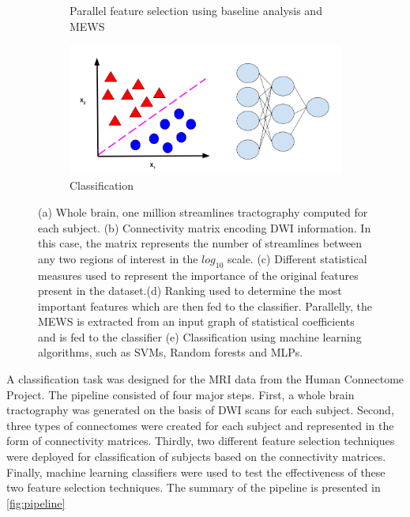 \documentclass[msthesis.tex]{subfiles}
\begin{document}
\begin{figure}
\begin{subfigure}[b]{0.9\textwidth}
\begin{subfigure}[b]{0.4\textwidth}
         \label{fig:mewspip}
         \end{subfigure}
    \vspace{-2em}
     \caption{Parallel feature selection using baseline analysis and MEWS}
    \end{subfigure}
    \vfill
        \begin{subfigure}[b]{0.6\textwidth}
         \centering
         \includegraphics[height =0.4\textwidth,width=\textwidth]{images/classification.png}
         \caption{Classification}
         \label{fig:three sin x}
         \end{subfigure}
    \caption{(a) Whole brain, one million streamlines tractography computed for each subject. (b) Connectivity matrix encoding DWI information. In this case, the matrix represents the number of streamlines between any two regions of interest in the $log_{10}$ scale. (c) Different statistical measures used to represent the importance of the original features present in the dataset.(d) Ranking used to determine the most important features which are then fed to the classifier. Parallelly, the MEWS is extracted from an input graph of statistical coefficients and is fed to the classifier (e) Classification using machine learning algorithms, such as SVMs, Random forests and MLPs.}
    \label{fig:pipeline}
\end{figure}

A classification task was designed for the MRI data from the Human Connectome Project. The pipeline consisted of four major steps. First, a whole brain tractography was generated on the basis of DWI scans for each subject. Second,  three types of connectomes were created for each subject and represented in the form of connectivity matrices. Thirdly, two different feature selection techniques were deployed for classification of subjects based on the connectivity matrices. Finally, machine learning classifiers were used to test the effectiveness of these two feature selection techniques. The summary of the pipeline is presented in \autoref{fig:pipeline}
\end{document}
